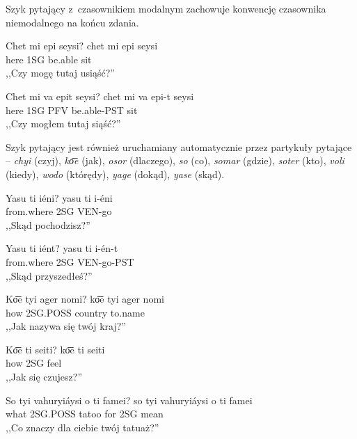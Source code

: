 \begin{spacing}{1.1}
Szyk pytający z~czasownikiem modalnym zachowuje konwencję czasownika
niemodalnego na końcu zdania.

\begin{exe}
	\ex
	\trans Chet mi epi seysi?
	\gll chet mi epi seysi\\
	  here 1SG be.able sit\\
	\glt  ,,Czy mogę tutaj usiąść?''
\end{exe}

\begin{exe}
	\ex
	\trans Chet mi va epit seysi?
	\gll chet mi va epi-t seysi\\
	  here 1SG PFV be.able-PST sit\\
	\glt  ,,Czy mogłem tutaj siąść?''
\end{exe}

Szyk pytający jest również uruchamiany automatycznie przez partykuły pytające -- 
\emph{chyi} (czyj), \emph{ko͞e} (jak), \emph{osor} (dlaczego), \emph{so} (co), 
\emph{somar} (gdzie), \emph{soter} (kto), \emph{voli} (kiedy), \emph{wodo} 
(którędy), \emph{yage} (dokąd), \emph{yase} (skąd).

\begin{exe}
	\ex
	\trans Yasu ti iéni?
	\gll yasu ti i-éni\\
	  from.where 2SG VEN-go\\
	\glt  ,,Skąd pochodzisz?''
\end{exe}

\begin{exe}
	\ex
	\trans Yasu ti iént?
	\gll yasu ti i-én-t\\
	  from.where 2SG VEN-go-PST\\
	\glt  ,,Skąd przyszedłeś?''
\end{exe}

\begin{exe}
	\ex
	\trans Ko͞e tyi ager nomi?
	\gll ko͞e tyi ager nomi\\
	  how 2SG.POSS country to.name\\
	\glt  ,,Jak nazywa się twój kraj?''
\end{exe}

\begin{exe}
	\ex
	\trans Ko͞e ti seiti?
	\gll ko͞e ti seiti\\
	  how 2SG feel\\
	\glt  ,,Jak się czujesz?''
\end{exe}

\begin{exe}
	\ex
	\trans So tyi vahuryiáysi o ti famei?
	\gll so tyi vahuryiáysi o ti famei\\
	  what 2SG.POSS tatoo for 2SG mean\\
	\glt  ,,Co znaczy dla ciebie twój tatuaż?''
\end{exe}


\end{spacing}
